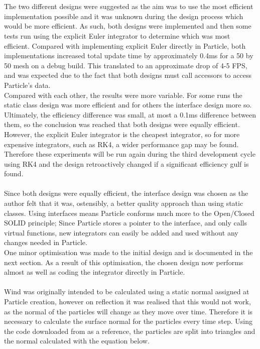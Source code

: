 \\\\The two different designs were suggested as the aim was to use the most efficient implementation possible and it was unknown during the design process which would be more efficient. As such, both designs were implemented and then some tests run using the explicit Euler integrator to determine which was most efficient. Compared with implementing explicit Euler directly in Particle, both implementations increased total update time by approximately 0.4ms for a 50 by 50 mesh on a debug build. This translated to an approximate drop of 4-5 FPS, and was expected due to the fact that both designs must call accessors to access Particle's data.
\\Compared with each other, the results were more variable. For some runs the static class design was more efficient and for others the interface design more so. Ultimately, the efficiency difference was small, at most a 0.1ms difference between them, so the conclusion was reached that both designs were equally efficient. However, the explicit Euler integrator is the cheapest integrator, so for more expensive integrators, such as RK4, a wider performance gap may be found. Therefore these experiments will be run again during the third development cycle using RK4 and the design retroactively changed if a significant efficiency gulf is found.
\\\\Since both designs were equally efficient, the interface design was chosen as the author felt that it was, ostensibly, a better quality approach than using static classes. Using interfaces means Particle conforms much more to the Open/Closed SOLID principle; Since Particle stores a pointer to the interface, and only calls virtual functions, new integrators can easily be added and used without any changes needed in Particle.
\\One minor optimisation was made to the initial design and is documented in the next section. As a result of this optimisation, the chosen design now performs almost as well as coding the integrator directly in Particle. 
\\\\Wind was originally intended to be calculated using a static normal assigned at Particle creation, however on reflection it was realised that this would not work, as the normal of the particles will change as they move over time. Therefore it is necessary to calculate the surface normal for the particles every time step. Using the code downloaded from \textcite{Mosegaard2009} as a reference, the particles are split into triangles and the normal calculated with the equation below.
